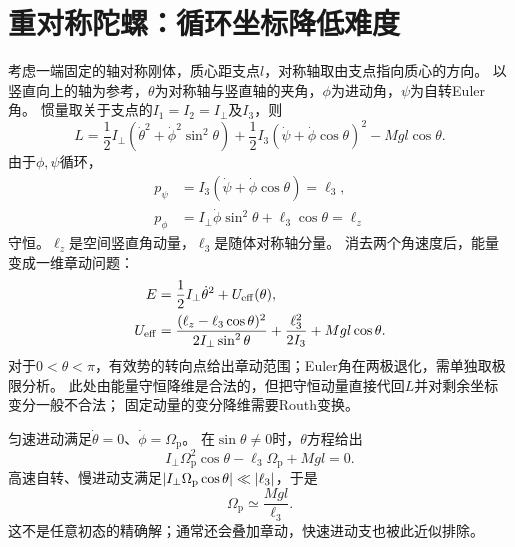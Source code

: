 \section{重对称陀螺：循环坐标降低难度}
考虑一端固定的轴对称刚体，质心距支点$l$，对称轴取由支点指向质心的方向。
以竖直向上的轴为参考，$\theta$为对称轴与竖直轴的夹角，$\phi$为进动角，$\psi$为自转Euler角。
惯量取关于支点的$I_1 = I_2 = I_\perp$及$I_3$，则
\begin{equation}
 L = \frac12I_\perp(\dot\theta^2 + \dot\phi^2\sin^2\theta)
 + \frac12I_3(\dot\psi + \dot\phi\cos\theta)^2 - Mgl\cos\theta.
\end{equation}
由于$\phi,\psi$循环，
\begin{subequations}
 \begin{align}
  p_\psi &= I_3(\dot\psi + \dot\phi\cos\theta) = \ell_3,\\
  p_\phi &= I_\perp\dot\phi\sin^2\theta + \ell_3\cos\theta = \ell_z
 \end{align}
\end{subequations}
守恒。$\ell_z$是空间竖直角动量，$\ell_3$是随体对称轴分量。
消去两个角速度后，能量变成一维章动问题：
\begin{subequations}
 \begin{align}
  E &= \frac12I_\perp\dot\theta^2 + U_{\mathrm{eff}}(\theta),\\
  U_{\mathrm{eff}} &= \frac{(\ell_z - \ell_3\cos\theta)^2}{2I_\perp\sin^2\theta}
  + \frac{\ell_3^2}{2I_3} + Mgl\cos\theta.
 \end{align}
\end{subequations}
对于$0 < \theta < \pi$，有效势的转向点给出章动范围；Euler角在两极退化，需单独取极限分析。
此处由能量守恒降维是合法的，但把守恒动量直接代回$L$并对剩余坐标变分一般不合法；
固定动量的变分降维需要Routh变换。

匀速进动满足$\dot\theta = 0$、$\dot\phi = \Omega_{\mathrm{p}}$。
在$\sin\theta \ne 0$时，$\theta$方程给出
\begin{equation}
 I_\perp\Omega_{\mathrm{p}}^2\cos\theta - \ell_3\Omega_{\mathrm{p}} + Mgl = 0.
\end{equation}
高速自转、慢进动支满足$\lvert I_\perp\Omega_{\mathrm{p}}\cos\theta\rvert \ll \lvert\ell_3\rvert$，于是
\begin{equation}
 \Omega_{\mathrm{p}} \simeq \frac{Mgl}{\ell_3}.
\end{equation}
这不是任意初态的精确解；通常还会叠加章动，快速进动支也被此近似排除。


